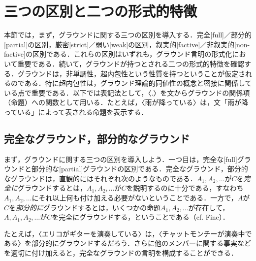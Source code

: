 \documentclass[twoside,14Q,uplatex,dvipdfmx]{jsarticle}
\theoremstyle{definition}
\begin{document}
\section{三つの区別と二つの形式的特徴}\label{assumption}
本節では，まず，グラウンドに関する三つの区別を導入する．完全[full]／部分的[partial]の区別，厳密[strict]／弱い[weak]の区別，叙実的[factive]／非叙実的[non-factive]の区別である．これらの区別はいずれも，グラウンド言明の形式化において重要である．続いて，グラウンドが持つとされる二つの形式的特徴を確認する．グラウンドは，非単調性，超内包性という性質を持つということが仮定されるのである．特に超内包性は，グラウンド理論的同値性の概念と密接に関係している点で重要である．以下では表記法として，〈.〉を文からグラウンドの関係項（命題）への関数として用いる．たとえば，〈雨が降っている〉は，文「雨が降っている」によって表される命題を表示する．

\subsection{完全なグラウンド，部分的なグラウンド}
まず，グラウンドに関する三つの区別を導入しよう．一つ目は，完全な[full]グラウンドと部分的な[partial]グラウンドの区別である．完全なグラウンド，部分的なグラウンドは，直観的にはそれぞれ次のようなものである．$A_1, A_2, \ldots$が$C$を\emph{完全に}グラウンドするとは，$A_1, A_2, \ldots$が$C$を説明するのに十分である，すなわち$A_1, A_2, \ldots$にそれ以上何も付け加える必要がないということである．一方で，$A$が$C$を\emph{部分的に}グラウンドするとは，いくつかの命題$A_1, A_2, \ldots$が存在して，$A, A_1, A_2, \ldots$が$C$を完全にグラウンドする，ということである（cf. Fine\cite[p.3]{Fine2012b}）．

たとえば，〈エリコがギターを演奏している〉は，〈チャットモンチーが演奏中である〉を部分的にグラウンドするだろう．さらに他のメンバーに関する事実などを適切に付け加えると，完全なグラウンドの言明を構成することができる．
\end{document}
